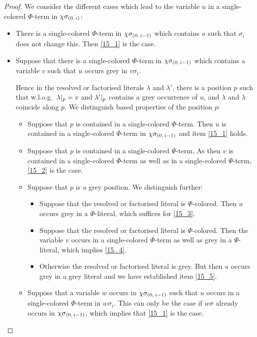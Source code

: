 \documentclass[,%
	draft=false,%
	numbers=noendperiod
	12pt,
	a4paper,
	oneside,%
	openany,
]{memoir}
\newcommand{\inv}{\ensuremath{\chi}}
\begin{document}
\begin{proof}
	We consider the different cases which lead to the variable $u$ in a single-colored $\Phi$-term in $\inv\sigmazi$:

	\begin{itemize}
		\item There is a single-colored $\Phi$-term in $\inv\sigmazmi$ which contains $u$ such that $\sigma_i$ does not change this.
			Then \ref{15_1} is the case.

		\item Suppose that there is a single-colored $\Phi$-term in $\inv\sigmazmi$ which contains a variable $v$ such that $u$ occurs grey in $v\sigma_i$.

			Hence in the resolved or factorised literals $\lambda$ and $\lambda'$, there is a position $p$ such that w.l.o.g.\ $\lambda|_{p} = v$ and $\lambda'|_{p}$ contains a grey occurrence of $u$, and $\lambda$ and $\lambda$ coincide along $p$.
			We distinguish based properties of the position $p$:

			\begin{itemize}
				\item Suppose that $p$ is contained in a single-colored $\Phi$-term.
					Then $u$ is contained in a single-colored $\Phi$-term in $\inv\sigmazmi$ and item \ref{15_1} holds.

				\item Suppose that $p$ is contained in a single-colored $\Psi$-term.
					As then $v$ is contained in a single-colored $\Phi$-term as well as in a single-colored $\Psi$-term, \ref{15_2} is the case.

				\item Suppose that $p$ is a grey position.
					We distinguish further:

					\begin{itemize}
						\item Suppose that the resolved or factorised literal is $\Phi$-colored.
							Then $u$ occurs grey in a $\Phi$-literal, which suffices for \ref{15_3}. 

						\item Suppose that the resolved or factorised literal is $\Psi$-colored.
							Then the variable $v$ occurs in a single-colored $\Phi$-term as well as grey in a $\Psi$-literal, which implies \ref{15_4}.

						\item
							Otherwise the resolved or factorised literal is grey. 
							But then $u$ occurs grey in a grey literal and we have established item \ref{15_5}.
					\end{itemize}


				\item Suppose that a variable $w$ occurs in $\inv\sigmazmi$ such that $u$ occurs in a single-colored $\Phi$-term in $w\sigma_i$.
					This can only be the case if $w\sigma$ already occurs in $\inv\sigmazmi$, which implies that \ref{15_1} is the case.
					\qedhere
			\end{itemize}
	\end{itemize}

\end{proof}
\end{document}
